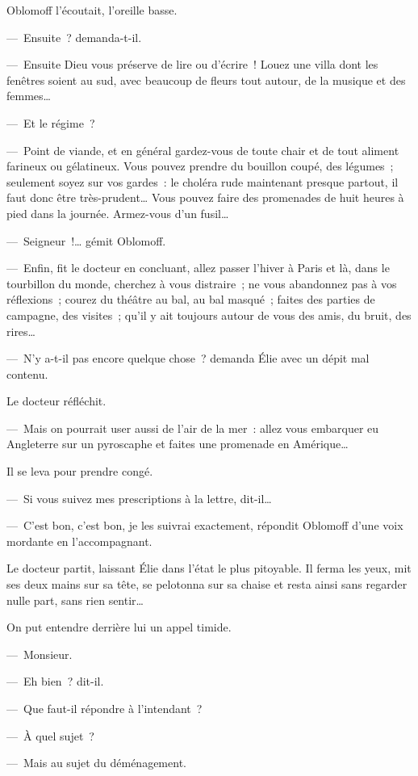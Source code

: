 \documentclass[french,twoside]{book} %
\begin{document}
Oblomoff l’écoutait, l’oreille basse.\par
— Ensuite ? demanda-t-il.\par
— Ensuite Dieu vous préserve de lire ou d’écrire ! Louez une villa dont les fenêtres soient au sud, avec beaucoup de fleurs tout autour, de la musique et des femmes…\par
— Et le régime ?\par
— Point de viande, et en général gardez-vous de toute chair et de tout aliment farineux ou gélatineux. Vous pouvez prendre du bouillon coupé, des légumes ; seulement soyez sur vos gardes : le choléra rude maintenant presque partout, il faut donc être très-prudent… Vous pouvez faire des promenades de huit heures à pied dans la journée. Armez-vous d’un fusil…\par
— Seigneur !… gémit Oblomoff.\par
— Enfin, fit le docteur en concluant, allez passer l’hiver à Paris et là, dans le tourbillon du monde, cherchez à vous distraire ; ne vous abandonnez pas à vos réflexions ; courez du théâtre au bal, au bal masqué ; faites des parties de campagne, des visites ; qu’il y ait toujours autour de vous des amis, du bruit, des rires…\par
— N’y a-t-il pas encore quelque chose ? demanda Élie avec un dépit mal contenu.\par
Le docteur réfléchit.\par
— Mais on pourrait user aussi de l’air de la mer : allez vous embarquer eu Angleterre sur un pyroscaphe et faites une promenade en Amérique…\par
Il se leva pour prendre congé.\par
— Si vous suivez mes prescriptions à la lettre, dit-il…\par
— C’est bon, c’est bon, je les suivrai exactement, répondit Oblomoff d’une voix mordante en l’accompagnant.\par
Le docteur partit, laissant Élie dans l’état le plus pitoyable. Il ferma les yeux, mit ses deux mains sur sa tête, se pelotonna sur sa chaise et resta ainsi sans regarder nulle part, sans rien sentir…\par
On put entendre derrière lui un appel timide.\par
— Monsieur.\par
— Eh bien ? dit-il.\par
— Que faut-il répondre à l’intendant ?\par
— À quel sujet ?\par
— Mais au sujet du déménagement.\par
\end{document}
